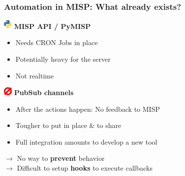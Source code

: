 \begin{frame}
    \frametitle{Automation in MISP: What already exists?}
    \includegraphics[valign=m,width=16px]{pictures/python-logo.png}\hspace*{0.5em} \textbf{MISP API / PyMISP}
    \hspace*{0.25em}
    \begin{itemize}
        \item Needs CRON Jobs in place
        \item Potentially heavy for the server
        \item Not realtime
    \end{itemize}
    \vspace*{1em}
    \includegraphics[valign=m,width=16px]{pictures/zeromq.png}\hspace*{0.5em} \textbf{PubSub channels}
    \hspace*{0.25em}
    \begin{itemize}
        \item After the actions happen: No feedback to MISP
        \item Tougher to put in place \& to share
        \item Full integration amounts to develop a new tool
    \end{itemize}
    \vspace*{0.5em}
    $\rightarrow$ No way to \textbf{prevent} behavior\\
    $\rightarrow$ Difficult to setup \textbf{hooks} to execute callbacks
\end{frame}

